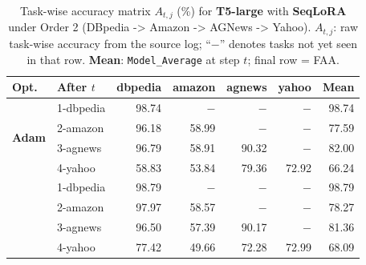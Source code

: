 
\begin{table}[ht]
\centering
\caption{%
  Task-wise accuracy matrix $A_{t,j}$ (\%) for \textbf{T5-large} with \textbf{SeqLoRA} under Order 2 (DBpedia -> Amazon -> AGNews -> Yahoo).
  $A_{t,j}$: raw task-wise accuracy from the source log; ``$-$'' denotes tasks not yet seen in that row.
  \textbf{Mean}: \texttt{Model\_Average} at step $t$; final row = FAA.
}
\label{tab:nlp_o2_t5large_seqlora}
\setlength{\tabcolsep}{4.0pt}
\renewcommand{\arraystretch}{0.92}
\scriptsize
\begin{tabular}{@{}l l r r r r r@{}}
\toprule
\textbf{Opt.} & \textbf{After $t$} & \textbf{dbpedia} & \textbf{amazon} & \textbf{agnews} & \textbf{yahoo} & \textbf{Mean} \\
\midrule
\multirow{4}{*}{\textbf{Adam}} & 1-dbpedia & 98.74 & $-$ & $-$ & $-$ & 98.74 \\
 & 2-amazon & 96.18 & 58.99 & $-$ & $-$ & 77.59 \\
 & 3-agnews & 96.79 & 58.91 & 90.32 & $-$ & 82.00 \\
 & 4-yahoo & 58.83 & 53.84 & 79.36 & 72.92 & 66.24 \\
\addlinespace[2pt]
\multirow{4}{*}{\textbf{SAM}} & 1-dbpedia & 98.79 & $-$ & $-$ & $-$ & 98.79 \\
 & 2-amazon & 97.97 & 58.57 & $-$ & $-$ & 78.27 \\
 & 3-agnews & 96.50 & 57.39 & 90.17 & $-$ & 81.36 \\
 & 4-yahoo & 77.42 & 49.66 & 72.28 & 72.99 & 68.09 \\
\bottomrule
\end{tabular}
\end{table}


